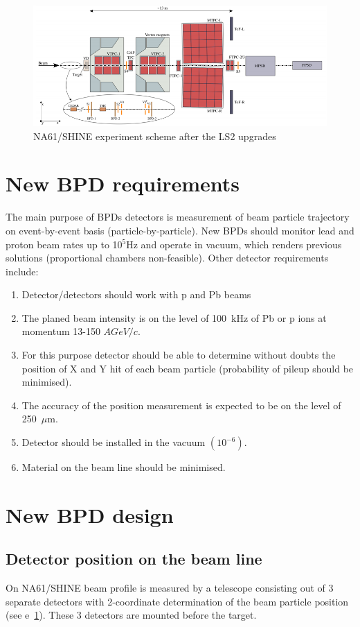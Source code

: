 \documentclass[a4paper]{jpconf}
\begin{document}
\begin{figure}[htbp]
	\centering
	\includegraphics[width=.7\textwidth]{NA61_scheme.png}
	\caption{\label{fig:1} NA61/SHINE experiment scheme after the LS2 upgrades}
\end{figure}

\section{New BPD requirements}
The main purpose of BPDs detectors is measurement of beam particle trajectory on event-by-event basis (particle-by-particle). New BPDs should monitor lead and proton beam rates up to 10$^5$Hz and operate in vacuum, which renders previous solutions (proportional chambers non-feasible). Other detector requirements include:
\begin{enumerate}
	\item Detector/detectors should work with p and Pb beams
	\item The planed beam intensity is on the level of 100~kHz of Pb or p ions at momentum 13-150 $AGeV/c$.
	\item For this purpose detector should be able to determine without doubts the position of X and Y hit of each beam particle (probability of pileup should be minimised).
	\item The accuracy of the position measurement is expected to be on the level of 250~$\mu$m.
	\item Detector should be installed in the vacuum $\left(10^{-6}\right)$.
	\item Material on the beam line should be minimised.
\end{enumerate}

\section{New BPD design}

\subsection{Detector position on the beam line}
On NA61/SHINE beam profile is measured by a telescope consisting out of 3 separate detectors with 2-coordinate determination of the beam particle position (see e~\ref{fig:1}). These 3 detectors are mounted before the target.
\end{document}
